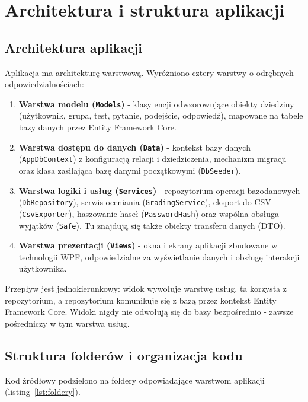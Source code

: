 ﻿\chapter{Architektura i struktura aplikacji}
\label{cha:architektura}

\section{Architektura aplikacji}
\label{sec:architektura}

Aplikacja ma architekturę warstwową. Wyróżniono cztery warstwy o odrębnych
odpowiedzialnościach:

\begin{enumerate}
  \item \textbf{Warstwa modelu (\texttt{Models})} - klasy encji odwzorowujące obiekty dziedziny
        (użytkownik, grupa, test, pytanie, podejście, odpowiedź), mapowane na tabele bazy danych
        przez Entity Framework Core.
  \item \textbf{Warstwa dostępu do danych (\texttt{Data})} - kontekst bazy danych
        (\texttt{AppDbContext}) z konfiguracją relacji i dziedziczenia, mechanizm migracji oraz klasa
        zasilająca bazę danymi początkowymi (\texttt{DbSeeder}).
  \item \textbf{Warstwa logiki i usług (\texttt{Services})} - repozytorium operacji bazodanowych
        (\texttt{DbRepository}), serwis oceniania (\texttt{GradingService}), eksport do CSV
        (\texttt{CsvExporter}), haszowanie haseł (\texttt{PasswordHash}) oraz wspólna obsługa
        wyjątków (\texttt{Safe}). Tu znajdują się także obiekty transferu danych (DTO).
  \item \textbf{Warstwa prezentacji (\texttt{Views})} - okna i ekrany aplikacji zbudowane w
        technologii WPF, odpowiedzialne za wyświetlanie danych i obsługę interakcji użytkownika.
\end{enumerate}

Przepływ jest jednokierunkowy: widok wywołuje warstwę usług, ta korzysta z repozytorium, a
repozytorium komunikuje się z bazą przez kontekst Entity Framework Core. Widoki nigdy nie odwołują
się do bazy bezpośrednio - zawsze pośredniczy w tym warstwa usług.

\section{Struktura folderów i organizacja kodu}
\label{sec:foldery}

Kod źródłowy podzielono na foldery odpowiadające warstwom aplikacji (listing~\ref{lst:foldery}).

